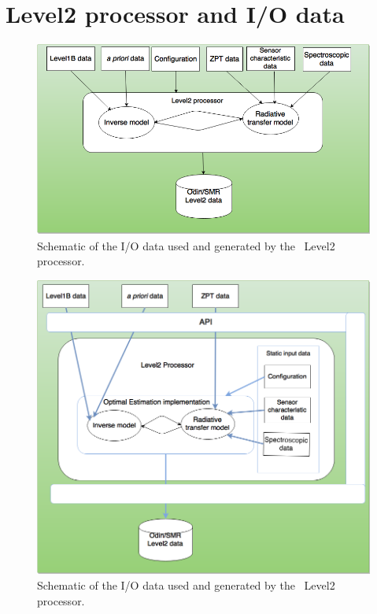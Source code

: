 \chapter{Level2 processor and I/O data}

\begin{figure}[t]
\centering
\includegraphics[width=14cm]{smr-level2-processor.png}
\caption{Schematic of the I/O data used and generated by the \smr\ Level2 processor.}
\label{fig:level2}
\end{figure}

\begin{figure}[t]
\centering
\includegraphics[width=14cm]{smr-level2-processor2.png}
\caption{Schematic of the I/O data used and generated by the \smr\ Level2 processor.}
\label{fig:level2b}
\end{figure}



